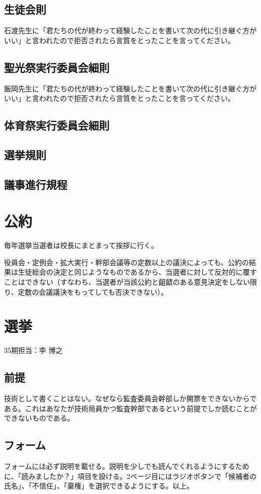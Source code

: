 \documentclass[dvipdfmx,jb5]{jarticle}
\begin{document}
\subsection{生徒会則}
石渡先生に「君たちの代が終わって経験したことを書いて次の代に引き継ぐ方がいい」と言われたので拒否されたら言質をとったことを言ってください。
\subsection{聖光祭実行委員会細則}
飯岡先生に「君たちの代が終わって経験したことを書いて次の代に引き継ぐ方がいい」と言われたので拒否されたら言質をとったことを言ってください。
\subsection{体育祭実行委員会細則}
\subsection{選挙規則}
\subsection{議事進行規程}
\section{公約}
毎年選挙当選者は校長にまとまって挨拶に行く。

役員会・定例会・拡大実行・幹部会議等の定数以上の議決によっても、公約の結果は生徒総会の決定と同じようなものであるから、当選者に対して反対的に覆すことはできない（すなわち、当選者が当該公約と齟齬のある意見決定をしない限り、定数の会議議決をもってしても否決できない）。
\section{選挙}
35期担当：李 博之
\subsection{前提}
技術として書くことはない。なぜなら監査委員会幹部しか開票をできないからである。これはあなたが技術局員かつ監査幹部であるという前提でしか読むことができないものである。
\subsection{フォーム}
フォームには必ず説明を載せる。説明を少しでも読んでくれるようにするために、「読みましたか？」項目を設ける。2ページ目にはラジオボタンで「候補者の氏名」、「不信任」、「棄権」を選択できるようにする。以上。
\end{document}
